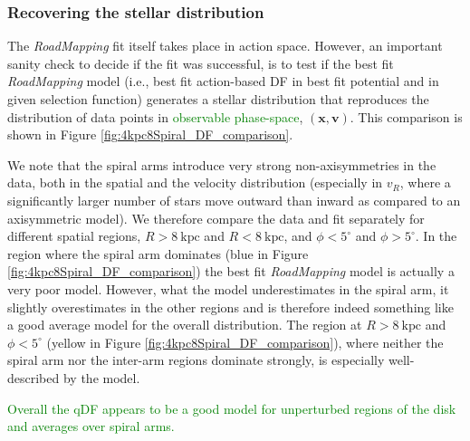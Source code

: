 \documentclass[iop,revtex4,numberedappendix,appendixfloats]{emulateapj}
\newcommand{\vect}[1]{\boldsymbol{#1}}
\newcommand{\RM}{{\sl RoadMapping}}
\newcommand{\NEW}[1]{\textcolor{Green}{#1}}
\newcommand{\OLD}[1]{}
\begin{document}
\subsubsection{Recovering the stellar distribution} \label{sec:4kpc8Spiral_DF}

The \RM{} fit itself takes place in action space. However, an important sanity check to decide if the fit was successful, is to test if the best fit \RM{} model (i.e., best fit action-based DF in best fit potential and in given selection function) generates a stellar distribution that reproduces the distribution of data points in \OLD{the phase-space of observables}\NEW{observable phase-space}, $(\vect{x},\vect{v})$. This comparison is shown in Figure \ref{fig:4kpc8Spiral_DF_comparison}. 

We note that the spiral arms introduce very strong non-axisymmetries in the data, both in the spatial and the velocity distribution (especially in $v_R$, where a significantly larger number of stars move outward than inward as compared to an axisymmetric model). We therefore compare the data and fit separately for different spatial regions, $R>8~\text{kpc}$ and $R<8~\text{kpc}$, and $\phi<5^\circ$ and $\phi>5^\circ$. In the region where the spiral arm dominates (blue in Figure \ref{fig:4kpc8Spiral_DF_comparison}) the best fit \RM{} model is actually a very poor model. However, what the model underestimates in the spiral arm, it slightly overestimates in the other regions and is therefore indeed something like a good average model for the overall distribution. The region at $R>8~\text{kpc}$ and $\phi<5^\circ$ (yellow in Figure \ref{fig:4kpc8Spiral_DF_comparison}), where neither the spiral arm nor the inter-arm regions dominate strongly, is especially well-described by the model. 

\OLD{We already expected the qDF to be a plausible model for the unperturbed disk. Here, we explicitly show that this is indeed the case, which is very encouraging. The only exceptions are of course the spiral arms, which the qDF had no chance to capture to begin with.}\NEW{Overall the qDF appears to be a good model for unperturbed regions of the disk and averages over spiral arms.}
\end{document}
